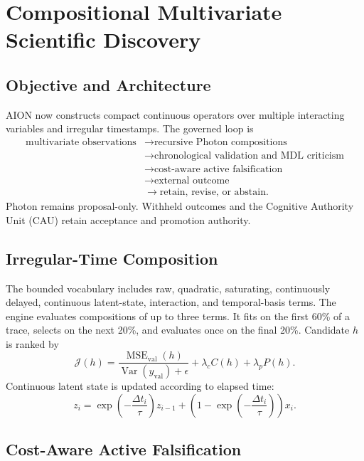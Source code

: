 \section{Compositional Multivariate Scientific Discovery}
\label{sec:compositional-multivariate-discovery}

\subsection{Objective and Architecture}

AION now constructs compact continuous operators over multiple interacting
variables and irregular timestamps. The governed loop is
\[
\begin{aligned}
\text{multivariate observations}
&\rightarrow \text{recursive Photon compositions}\\
&\rightarrow \text{chronological validation and MDL criticism}\\
&\rightarrow \text{cost-aware active falsification}\\
&\rightarrow \text{external outcome}\\
&\rightarrow \text{retain, revise, or abstain}.
\end{aligned}
\]
Photon remains proposal-only. Withheld outcomes and the Cognitive Authority
Unit (CAU) retain acceptance and promotion authority.

\subsection{Irregular-Time Composition}

The bounded vocabulary includes raw, quadratic, saturating, continuously
delayed, continuous latent-state, interaction, and temporal-basis terms. The
engine evaluates compositions of up to three terms. It fits on the first 60\%
of a trace, selects on the next 20\%, and evaluates once on the final 20\%.
Candidate \(h\) is ranked by
\[
\mathcal{J}(h)
=
\frac{\operatorname{MSE}_{\mathrm{val}}(h)}
     {\operatorname{Var}(y_{\mathrm{val}})+\epsilon}
+\lambda_c C(h)+\lambda_p P(h).
\]
Continuous latent state is updated according to elapsed time:
\[
z_i =
\exp\!\left(-\frac{\Delta t_i}{\tau}\right)z_{i-1}
+
\left(1-\exp\!\left(-\frac{\Delta t_i}{\tau}\right)\right)x_i.
\]

\subsection{Cost-Aware Active Falsification}

